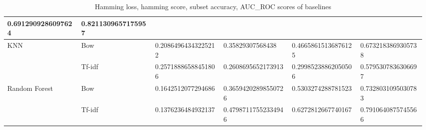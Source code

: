 \begin{table}[h!]
{\begin{tabular}{@{}llrrrr@{}}
  \multicolumn{1}{l|}{\textbf{0.6912909286097624}} &
  \multicolumn{1}{l|}{\textbf{0.8211309657175957}} \\ \midrule
\multicolumn{1}{|l|}{\multirow{2}{*}{KNN}} &
  \multicolumn{1}{l|}{Bow} &
  \multicolumn{1}{l|}{0.20864964343225212} &
  \multicolumn{1}{l|}{0.35829307568438} &
  \multicolumn{1}{l|}{0.46658615136876125} &
  \multicolumn{1}{l|}{0.6732183869305738} \\ \cmidrule(l){2-6} 
\multicolumn{1}{|l|}{} &
  \multicolumn{1}{l|}{Tf-idf} &
  \multicolumn{1}{l|}{0.25718886588451806} &
  \multicolumn{1}{l|}{0.2608695652173913} &
  \multicolumn{1}{l|}{0.29985238862050506} &
  \multicolumn{1}{l|}{0.5795307836306697} \\ \midrule
\multicolumn{1}{|l|}{\multirow{2}{*}{Random Forest}} &
  \multicolumn{1}{l|}{Bow} &
  \multicolumn{1}{l|}{0.1642512077294686} &
  \multicolumn{1}{l|}{0.36594202898550726} &
  \multicolumn{1}{l|}{0.5303274288781523} &
  \multicolumn{1}{l|}{0.7328031095030783} \\ \cmidrule(l){2-6}
\multicolumn{1}{|l|}{} &
  \multicolumn{1}{l|}{Tf-idf} &
  \multicolumn{1}{l|}{0.1376236484932137} &
  \multicolumn{1}{l|}{0.47987117552334946} &
  \multicolumn{1}{l|}{0.6272812667740167} &
  \multicolumn{1}{l|}{0.7910640875745566} \\ \bottomrule
\end{tabular}%
}
\caption{Hamming loss, hamming score, subset accuracy, AUC\_ROC scores of baselines}
\label{tab:sample_based_baseline}
\end{table}



